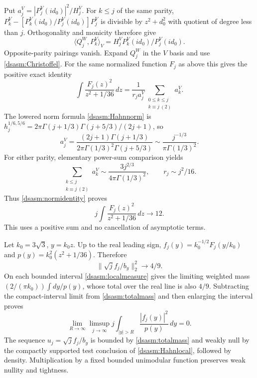 \documentclass[11pt,letterpaper]{article}
\theoremstyle{remark}\newtheorem{remark}[theorem]{Remark}
\begin{document}
Put $a_j^V=|P_j^V(id_0)|^2/H_j^V$. For $k\le j$ of the same parity,
$P_k^V-[P_k^V(id_0)/P_j^V(id_0)]P_j^V$ is divisible by $z^2+d_0^2$
with quotient of degree less than $j$. Orthogonality and monicity
therefore give
\[
 \langle Q_j^W,P_k^V\rangle_V
       =H_j^V P_k^V(id_0)/P_j^V(id_0).
\]
Opposite-parity pairings vanish. Expand $Q_j^W$ in the $V$ basis
and use \eqref{dsasm:Christoffel}. For the same normalized function $F_j$
as above this gives the positive exact identity
\begin{equation}\label{dsasm:normidentity}
 \int\frac{F_j(z)^2}{z^2+1/36}\,dz
       =\frac1{r_ja_j^V}\sum_{\substack{0\le k\le j\\k\equiv j\ (2)}}a_k^V.
\end{equation}
The lowered norm formula \eqref{dsasm:Hahnnorm} is
$h_j^{1/6,5/6}=2\pi\Gamma(j+1/3)\Gamma(j+5/3)/(2j+1)$,
so
\[
 a_j^V=\frac{(2j+1)\Gamma(j+1/3)}
                  {2\pi\Gamma(1/3)^2\Gamma(j+5/3)}
      \sim\frac{j^{-1/3}}{\pi\Gamma(1/3)^2}.
\]
For either parity, elementary power-sum comparison yields
\[
 \sum_{\substack{k\le j\\k\equiv j\ (2)}}a_k^V
       \sim\frac{3j^{2/3}}{4\pi\Gamma(1/3)^2},\qquad r_j\sim j^2/16.
\]
Thus \eqref{dsasm:normidentity} proves
\begin{equation}\label{dsasm:totalmassz}
 j\int\frac{F_j(z)^2}{z^2+1/36}\,dz\longrightarrow12.
\end{equation}
This uses a positive sum and no cancellation of asymptotic terms.

Let $k_0=3\sqrt3$, $y=k_0z$. Up to the real leading sign,
$f_j(y)=k_0^{-1/2}F_j(y/k_0)$ and
$p(y)=k_0^2(z^2+1/36)$. Therefore
\begin{equation}\label{dsasm:totalmass}
 \|\sqrt j f_j/b_y\|_2^2\longrightarrow4/9.
\end{equation}
On each bounded interval \eqref{dsasm:localmeasure} gives the limiting
weighted mass $(2/(\pi k_0))\int dy/p(y)$, whose total over the real
line is also $4/9$. Subtracting the compact-interval limit from
\eqref{dsasm:totalmass} and then enlarging the interval proves
\begin{equation}\label{dsasm:tightness}
 \lim_{R\to\infty}\limsup_{j\to\infty}
      j\int_{|y|>R}\frac{|f_j(y)|^2}{p(y)}\,dy=0.
\end{equation}
The sequence $u_j=\sqrt j f_j/b_y$ is bounded by \eqref{dsasm:totalmass}
and weakly null by the compactly supported test conclusion of
\eqref{dsasm:Hahnlocal}, followed by density. Multiplication by a fixed
bounded unimodular function preserves weak nullity and tightness.
\end{document}
